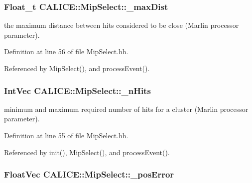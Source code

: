 \subsubsection[{\-\_\-max\-Dist}]{\setlength{\rightskip}{0pt plus 5cm}Float\-\_\-t C\-A\-L\-I\-C\-E\-::\-Mip\-Select\-::\-\_\-max\-Dist\hspace{0.3cm}{\ttfamily [protected]}}\label{classCALICE_1_1MipSelect_af5b5c0952ac42edf3e33ccc3354ce999}


the maximum distance between hits considered to be close (Marlin processor parameter). 



Definition at line 56 of file Mip\-Select.\-hh.



Referenced by Mip\-Select(), and process\-Event().

\subsubsection[{\-\_\-n\-Hits}]{\setlength{\rightskip}{0pt plus 5cm}Int\-Vec C\-A\-L\-I\-C\-E\-::\-Mip\-Select\-::\-\_\-n\-Hits\hspace{0.3cm}{\ttfamily [protected]}}\label{classCALICE_1_1MipSelect_a9942825c9ee70c394f78dde00c43c8ef}


minimum and maximum required number of hits for a cluster (Marlin processor parameter). 



Definition at line 55 of file Mip\-Select.\-hh.



Referenced by init(), Mip\-Select(), and process\-Event().

\subsubsection[{\-\_\-pos\-Error}]{\setlength{\rightskip}{0pt plus 5cm}Float\-Vec C\-A\-L\-I\-C\-E\-::\-Mip\-Select\-::\-\_\-pos\-Error\hspace{0.3cm}{\ttfamily [protected]}}\label{classCALICE_1_1MipSelect_a47f1821c1518e00d403d026c5b1eb848}


